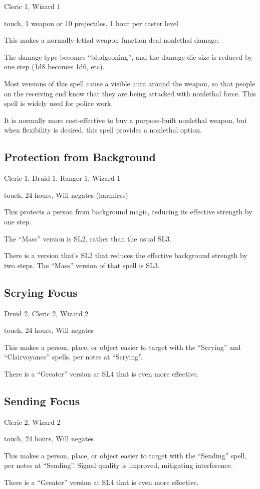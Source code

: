 Cleric 1, Wizard 1

touch, 1 weapon or 10 projectiles, 1 hour per caster level

This makes a normally-lethal weapon function deal nonlethal damage.

The damage type becomes ``bludgeoning'', and the damage die size is
reduced by one step (1d8 becomes 1d6, etc).

Most versions of this spell cause a visible aura around the weapon, so
that people on the receiving end know that they are being attacked with
nonlethal force. This spell is widely used for police work.

It is normally more cost-effective to buy a purpose-built nonlethal weapon,
but when flexibility is desired, this spell provides a nonlethal option.
%

%
\subsection{Protection from Background}

Cleric 1, Druid 1, Ranger 1, Wizard 1

touch, 24 hours, Will negates (harmless)

This protects a person from background magic, reducing its effective
strength by one step.

The ``Mass'' version is SL2, rather than the usual SL3.

There is a version that's SL2 that reduces the effective background
strength by two steps. The ``Mass'' version of that spell is SL3.
%

%
\subsection{Scrying Focus}

Druid 2, Cleric 2, Wizard 2

touch, 24 hours, Will negates

This makes a person, place, or object easier to target with the ``Scrying''
and ``Clairvoyance'' spells, per notes at ``Scrying''.

There is a ``Greater'' version at SL4 that is even more effective.
%

%
\subsection{Sending Focus}

Cleric 2, Wizard 2

touch, 24 hours, Will negates

This makes a person, place, or object easier to target with the ``Sending''
spell, per notes at ``Sending''. Signal quality is improved, mitigating
interference.

There is a ``Greater'' version at SL4 that is even more effective.
%

%
